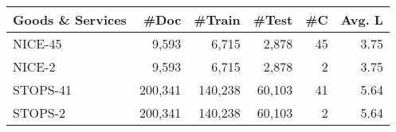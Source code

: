 \documentclass[runningheads]{llncs}
\begin{document}
\begin{table}[ht]
\begin{tabular}{l|rrrrr}
            \toprule
            \textbf{Goods \& Services}           & \textbf{\#Doc} & \textbf{\#Train} & \textbf{\#Test} & \textbf{\#C} & \textbf{Avg. L} \\
            \midrule
            NICE-45                              & 9,593          & 6,715            & 2,878           & 45                 & 3.75                 \\
            NICE-2                               & 9,593          & 6,715            & 2,878           & 2                  & 3.75                 \\
            STOPS-41                             & 200,341        & 140,238          & 60,103          & 41                 & 5.64                 \\
            STOPS-2                              & 200,341        & 140,238          & 60,103          & 2                  & 5.64                 \\
            \bottomrule
        \end{tabular}
    \end{table}
\end{document}
